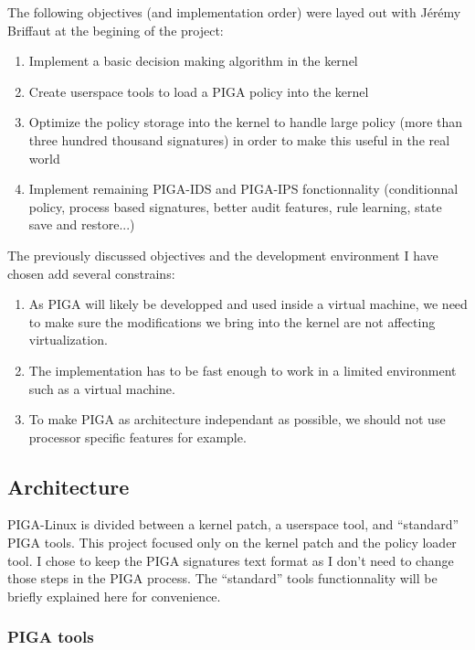 \documentclass[pdftex,a4paper,titlepage,11pt]{article}
\begin{document}
The following objectives (and implementation order) were layed out with Jérémy
Briffaut at the begining of the project:

\begin{enumerate}
	\item Implement a basic decision making algorithm in the kernel
	\item Create userspace tools to load a PIGA policy into the kernel
	\item Optimize the policy storage into the kernel to handle large policy
(more than three hundred thousand signatures) in order to make this useful in
the real world
	\item Implement remaining PIGA-IDS and PIGA-IPS fonctionnality (conditionnal
policy, process based signatures, better audit features, rule learning, state
save and restore...)
\end{enumerate}

\smallskip

The previously discussed objectives and the development environment I have
chosen add several constrains:

\begin{enumerate}
	\item As PIGA will likely be developped and used inside a virtual machine,
we need to make sure the modifications we bring into the kernel are not
affecting virtualization.
	\item The implementation has to be fast enough to work in a limited
environment such as a virtual machine.
	\item To make PIGA as architecture independant as possible, we should not
use processor specific features for example.
\end{enumerate}


\subsection{Architecture}

PIGA-Linux is divided between a kernel patch, a userspace tool, and ``standard''
PIGA tools. This project focused only on the kernel patch and the policy loader
tool. I chose to keep the PIGA signatures text format as I don't need to change
those steps in the PIGA process. The ``standard'' tools functionnality will be
briefly explained here for convenience.

\subsubsection{PIGA tools}
\end{document}
